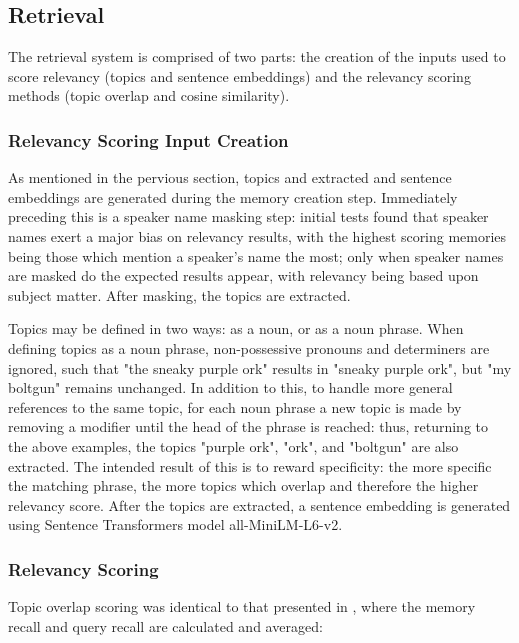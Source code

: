
\subsection{Retrieval}

The retrieval system is comprised of two parts: the creation of the inputs used to score relevancy (topics and sentence embeddings) and the relevancy scoring methods (topic overlap and cosine similarity). 


\subsubsection{Relevancy Scoring Input Creation} 
\label{relevancy_scoring_input_creation}

As mentioned in the pervious section, topics and extracted and sentence embeddings are generated during the memory creation step. Immediately preceding this is a speaker name masking step: initial tests found that speaker names exert a major bias on relevancy results, with the highest scoring memories being those which mention a speaker's name the most; only when speaker names are masked do the expected results appear, with relevancy being based upon subject matter. After masking, the topics are extracted. 

Topics may be defined in two ways: as a noun, or as a noun phrase. When defining topics as a noun phrase, non-possessive pronouns and determiners are ignored, such that "the sneaky purple ork" results in "sneaky purple ork", but "my boltgun" remains unchanged. In addition to this, to handle more general references to the same topic, for each noun phrase a new topic is made by removing a modifier until the head of the phrase is reached: thus, returning to the above examples, the topics "purple ork", "ork", and "boltgun" are also extracted. The intended result of this is to reward specificity: the more specific the matching phrase, the more topics which overlap and therefore the higher relevancy score. After the topics are extracted, a sentence embedding is generated using Sentence Transformers model all-MiniLM-L6-v2.


\subsubsection{Relevancy Scoring}

Topic overlap scoring was identical to that presented in \cite{Li2024}, where the memory recall and query recall are calculated and averaged:

